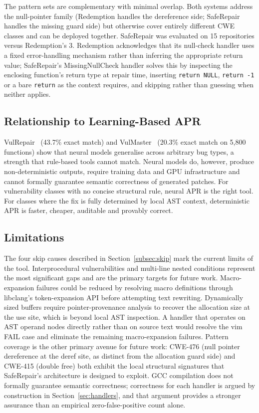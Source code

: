 \documentclass[conference]{IEEEtran}
\begin{document}
The pattern sets are complementary with minimal overlap. Both systems address the
null-pointer family (Redemption handles the dereference side; SafeRepair handles
the missing guard side) but otherwise cover entirely different CWE classes and can
be deployed together. SafeRepair was evaluated on 15 repositories versus
Redemption's 3. Redemption acknowledges that its null-check handler uses a fixed
error-handling mechanism rather than inferring the appropriate return value;
SafeRepair's MissingNullCheck handler solves this by inspecting the enclosing
function's return type at repair time, inserting \texttt{return NULL},
\texttt{return -1} or a bare \texttt{return} as the context requires, and
skipping rather than guessing when neither applies.

\subsection{Relationship to Learning-Based APR}
VulRepair~\cite{b4} (43.7\% exact match) and VulMaster~\cite{b3} (20.3\% exact
match on 5,800 functions) show that neural models generalise across arbitrary bug
types, a strength that rule-based tools cannot match. Neural models do, however,
produce non-deterministic outputs, require training data and GPU infrastructure
and cannot formally guarantee semantic correctness of generated patches. For vulnerability classes with no concise structural rule, neural APR is the right
tool. For classes where the fix is fully determined by local AST context,
deterministic APR is faster, cheaper, auditable and provably correct.

\subsection{Limitations}
The four skip causes described in Section~\ref{subsec:skip} mark the current limits of the tool.
Interprocedural vulnerabilities and multi-line nested conditions represent the
most significant gaps and are the primary targets for future work. Macro-expansion
failures could be reduced by resolving macro definitions through libclang's
token-expansion API before attempting text rewriting. Dynamically sized buffers
require pointer-provenance analysis to recover the allocation size at the use
site, which is beyond local AST inspection. A handler that operates on AST operand
nodes directly rather than on source text would resolve the vim FAIL case and
eliminate the remaining macro-expansion failures. Pattern coverage is the other primary
avenue for future work: CWE-476 (null pointer dereference at the deref site, as
distinct from the allocation guard side) and CWE-415 (double free) both exhibit
the local structural signatures that SafeRepair's architecture is designed to
exploit. GCC compilation does not formally guarantee semantic correctness;
correctness for each handler is argued by construction in
Section~\ref{sec:handlers}, and that argument provides a stronger assurance than
an empirical zero-false-positive count alone.
\end{document}
